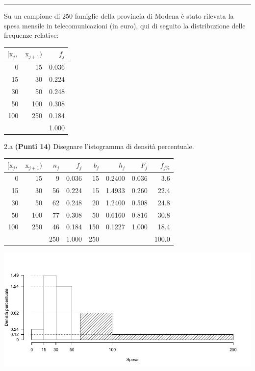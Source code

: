\documentclass[
  11pt,
]{book}
\theoremstyle{mytheoremstyle}
\theoremstyle{mydefstyle}
\newenvironment{sol}
  {
  \begin{tcolorbox}[enhanced,breakable,arc=0.1mm,boxrule=1pt,colback=white,colframe=iblue,
  title=\bf \fontfamily{lmss}\selectfont \hspace{.5 cm} Soluzione,drop fuzzy shadow]

}{
\end{tcolorbox}
  }
\begin{document}
\begin{center}\rule{0.5\linewidth}{0.5pt}\end{center}

Su un campione di \(250\) famiglie della provincia di Modena è stato rilevata la spesa mensile in telecomunicazioni (in euro), qui di seguito
la distribuzione delle frequenze relative:

\begin{table}[H]
\centering
\begin{tabular}{rrr}
\toprule
$[\text{x}_j,$ & $\text{x}_{j+1})$ & $f_j$\\
\midrule
0 & 15 & 0.036\\
15 & 30 & 0.224\\
30 & 50 & 0.248\\
50 & 100 & 0.308\\
100 & 250 & 0.184\\
 &  & 1.000\\
\bottomrule
\end{tabular}
\end{table}

2.a \textbf{(Punti 14)} Disegnare l'istogramma di densità percentuale.

\begin{sol}

\begin{table}[H]
\centering
\begin{tabular}{rrrrrrrr}
\toprule
$[\text{x}_j,$ & $\text{x}_{j+1})$ & $n_j$ & $f_j$ & $b_j$ & $h_j$ & $F_j$ & $f_{j\%}$\\
\midrule
0 & 15 & 9 & 0.036 & 15 & 0.2400 & 0.036 & 3.6\\
15 & 30 & 56 & 0.224 & 15 & 1.4933 & 0.260 & 22.4\\
30 & 50 & 62 & 0.248 & 20 & 1.2400 & 0.508 & 24.8\\
50 & 100 & 77 & 0.308 & 50 & 0.6160 & 0.816 & 30.8\\
100 & 250 & 46 & 0.184 & 150 & 0.1227 & 1.000 & 18.4\\
 &  & 250 & 1.000 & 250 &  &  & 100.0\\
\bottomrule
\end{tabular}
\end{table}

\begin{center}\includegraphics{Appunti_di_Statistica_2025_files/figure-latex/25-test-functions-18-1} \end{center}

\end{sol}
\end{document}
